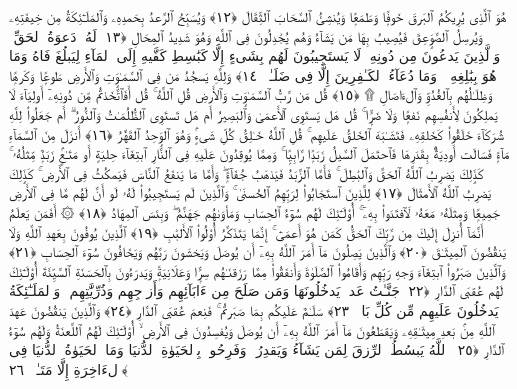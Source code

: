  هُوَ ٱلَّذِى يُرِيكُمُ ٱلبَرقَ خَوفًۭا وَطَمَعًۭا وَيُنشِئُ ٱلسَّحَابَ ٱلثِّقَالَ ﴿١٢﴾
 وَيُسَبِّحُ ٱلرَّعدُ بِحَمدِهِۦ وَٱلمَلَـٰٓئِكَةُ مِن خِيفَتِهِۦ وَيُرسِلُ ٱلصَّوَٟعِقَ فَيُصِيبُ بِهَا مَن يَشَآءُ وَهُم يُجَٰدِلُونَ فِى ٱللَّهِ وَهُوَ شَدِيدُ ٱلمِحَالِ ﴿١٣﴾
 لَهُۥ دَعوَةُ ٱلحَقِّ ۖ وَٱلَّذِينَ يَدعُونَ مِن دُونِهِۦ لَا يَستَجِيبُونَ لَهُم بِشَىءٍ إِلَّا كَبَٰسِطِ كَفَّيهِ إِلَى ٱلمَآءِ لِيَبلُغَ فَاهُ وَمَا هُوَ بِبَٰلِغِهِۦ ۚ وَمَا دُعَآءُ ٱلكَـٰفِرِينَ إِلَّا فِى ضَلَـٰلٍۢ ﴿١٤﴾
 وَلِلَّهِ يَسجُدُ مَن فِى ٱلسَّمَـٰوَٟتِ وَٱلأَرضِ طَوعًۭا وَكَرهًۭا وَظِلَـٰلُهُم بِٱلغُدُوِّ وَٱلءَاصَالِ ۩ ﴿١٥﴾
 قُل مَن رَّبُّ ٱلسَّمَـٰوَٟتِ وَٱلأَرضِ قُلِ ٱللَّهُ ۚ قُل أَفَٱتَّخَذتُم مِّن دُونِهِۦٓ أَولِيَآءَ لَا يَملِكُونَ لِأَنفُسِهِم نَفعًۭا وَلَا ضَرًّۭا ۚ قُل هَل يَستَوِى ٱلأَعمَىٰ وَٱلبَصِيرُ أَم هَل تَستَوِى ٱلظُّلُمَـٰتُ وَٱلنُّورُ ۗ أَم جَعَلُوا۟ لِلَّهِ شُرَكَآءَ خَلَقُوا۟ كَخَلقِهِۦ فَتَشَـٰبَهَ ٱلخَلقُ عَلَيهِم ۚ قُلِ ٱللَّهُ خَـٰلِقُ كُلِّ شَىءٍۢ وَهُوَ ٱلوَٟحِدُ ٱلقَهَّٰرُ ﴿١٦﴾
 أَنزَلَ مِنَ ٱلسَّمَآءِ مَآءًۭ فَسَالَت أَودِيَةٌۢ بِقَدَرِهَا فَٱحتَمَلَ ٱلسَّيلُ زَبَدًۭا رَّابِيًۭا ۚ وَمِمَّا يُوقِدُونَ عَلَيهِ فِى ٱلنَّارِ ٱبتِغَآءَ حِليَةٍ أَو مَتَـٰعٍۢ زَبَدٌۭ مِّثلُهُۥ ۚ كَذَٟلِكَ يَضرِبُ ٱللَّهُ ٱلحَقَّ وَٱلبَٰطِلَ ۚ فَأَمَّا ٱلزَّبَدُ فَيَذهَبُ جُفَآءًۭ ۖ وَأَمَّا مَا يَنفَعُ ٱلنَّاسَ فَيَمكُثُ فِى ٱلأَرضِ ۚ كَذَٟلِكَ يَضرِبُ ٱللَّهُ ٱلأَمثَالَ ﴿١٧﴾
 لِلَّذِينَ ٱستَجَابُوا۟ لِرَبِّهِمُ ٱلحُسنَىٰ ۚ وَٱلَّذِينَ لَم يَستَجِيبُوا۟ لَهُۥ لَو أَنَّ لَهُم مَّا فِى ٱلأَرضِ جَمِيعًۭا وَمِثلَهُۥ مَعَهُۥ لَٱفتَدَوا۟ بِهِۦٓ ۚ أُو۟لَـٰٓئِكَ لَهُم سُوٓءُ ٱلحِسَابِ وَمَأوَىٰهُم جَهَنَّمُ ۖ وَبِئسَ ٱلمِهَادُ ﴿١٨﴾
 ۞ أَفَمَن يَعلَمُ أَنَّمَآ أُنزِلَ إِلَيكَ مِن رَّبِّكَ ٱلحَقُّ كَمَن هُوَ أَعمَىٰٓ ۚ إِنَّمَا يَتَذَكَّرُ أُو۟لُوا۟ ٱلأَلبَٰبِ ﴿١٩﴾
 ٱلَّذِينَ يُوفُونَ بِعَهدِ ٱللَّهِ وَلَا يَنقُضُونَ ٱلمِيثَـٰقَ ﴿٢٠﴾
 وَٱلَّذِينَ يَصِلُونَ مَآ أَمَرَ ٱللَّهُ بِهِۦٓ أَن يُوصَلَ وَيَخشَونَ رَبَّهُم وَيَخَافُونَ سُوٓءَ ٱلحِسَابِ ﴿٢١﴾
 وَٱلَّذِينَ صَبَرُوا۟ ٱبتِغَآءَ وَجهِ رَبِّهِم وَأَقَامُوا۟ ٱلصَّلَوٰةَ وَأَنفَقُوا۟ مِمَّا رَزَقنَـٰهُم سِرًّۭا وَعَلَانِيَةًۭ وَيَدرَءُونَ بِٱلحَسَنَةِ ٱلسَّيِّئَةَ أُو۟لَـٰٓئِكَ لَهُم عُقبَى ٱلدَّارِ ﴿٢٢﴾
 جَنَّـٰتُ عَدنٍۢ يَدخُلُونَهَا وَمَن صَلَحَ مِن ءَابَآئِهِم وَأَزوَٟجِهِم وَذُرِّيَّٰتِهِم ۖ وَٱلمَلَـٰٓئِكَةُ يَدخُلُونَ عَلَيهِم مِّن كُلِّ بَابٍۢ ﴿٢٣﴾
 سَلَـٰمٌ عَلَيكُم بِمَا صَبَرتُم ۚ فَنِعمَ عُقبَى ٱلدَّارِ ﴿٢٤﴾
 وَٱلَّذِينَ يَنقُضُونَ عَهدَ ٱللَّهِ مِنۢ بَعدِ مِيثَـٰقِهِۦ وَيَقطَعُونَ مَآ أَمَرَ ٱللَّهُ بِهِۦٓ أَن يُوصَلَ وَيُفسِدُونَ فِى ٱلأَرضِ ۙ أُو۟لَـٰٓئِكَ لَهُمُ ٱللَّعنَةُ وَلَهُم سُوٓءُ ٱلدَّارِ ﴿٢٥﴾
 ٱللَّهُ يَبسُطُ ٱلرِّزقَ لِمَن يَشَآءُ وَيَقدِرُ ۚ وَفَرِحُوا۟ بِٱلحَيَوٰةِ ٱلدُّنيَا وَمَا ٱلحَيَوٰةُ ٱلدُّنيَا فِى ٱلءَاخِرَةِ إِلَّا مَتَـٰعٌۭ ﴿٢٦﴾
